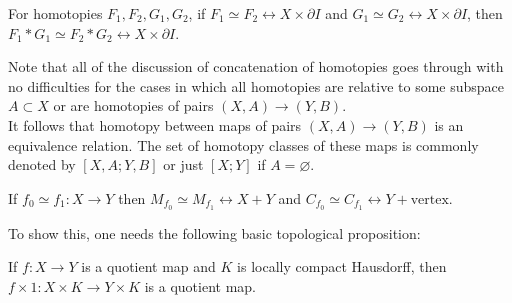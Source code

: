 \begin{proposition}[]
    For homotopies $F_1, F_2, G_1, G_2$,
    if $F_1 \simeq F_2 \rel X \times \partial I$ and
    $G_1 \simeq G_2 \rel X \times \partial I$, then
    $F_1 * G_1 \simeq F_2 * G_2 \rel X \times \partial I$.
\end{proposition}

Note that all of the discussion of concatenation of
homotopies goes through with no difficulties for the cases
in which all homotopies are relative to some subspace
$A \subset X$ or are homotopies of pairs
$\left( X, A  \right) \to \left( Y, B \right) $.\\
It follows that homotopy between maps of
pairs $\left( X,A \right) \to \left( Y,B \right) $ is
an equivalence relation. The set of homotopy classes
of these maps is commonly denoted by
$\left[ X,A ; Y ,B \right] $ or just
$\left[ X;Y \right] $ if $A = \varnothing$.

\begin{theorem}[]\label{Thm:299221}
    If $f_0 \simeq f_1 \colon X \to Y$ then
    $M_{f_0} \simeq M_{f_1} \rel
    X + Y$ and
    $C_{f_0} \simeq C_{f_1} \rel
    Y + \text{vertex}$.
\end{theorem}


To show this, one needs the following basic topological
proposition:
\begin{proposition}[] \label{prop:92031999}
    If $f \colon X \to Y$ is a quotient map and
    $K$ is locally compact Hausdorff, then
    $f \times 1 \colon X \times K \to Y \times K$ is
    a quotient map.
\end{proposition}

